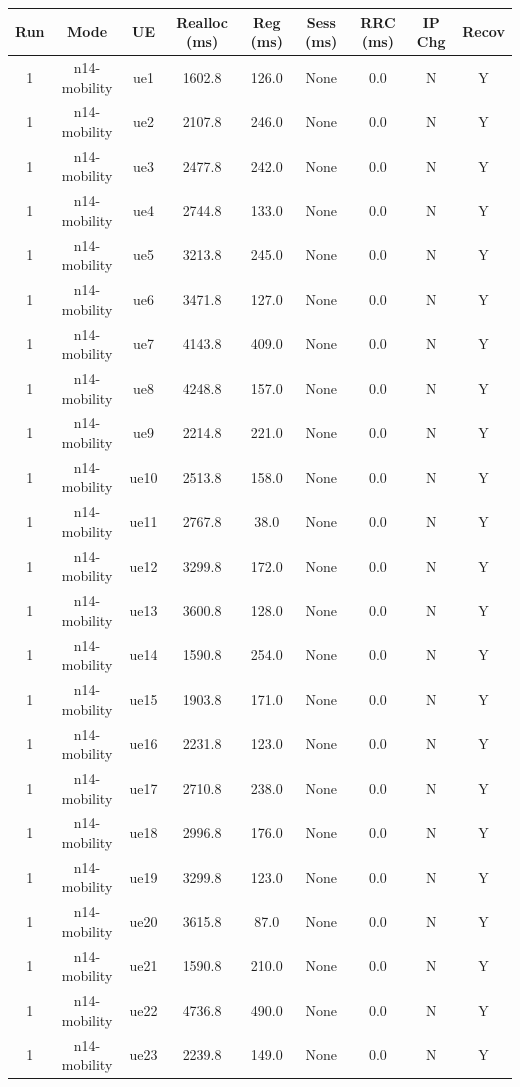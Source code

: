 \begin{table}[ht]
\centering
\begin{tabular}{|c|c|c|c|c|c|c|c|c|}
\hline
Run & Mode & UE & Realloc (ms) & Reg (ms) & Sess (ms) & RRC (ms) & IP Chg & Recov \\
\hline
1 & n14-mobility & ue1 & 1602.8 & 126.0 & None & 0.0 & N & Y \\
1 & n14-mobility & ue2 & 2107.8 & 246.0 & None & 0.0 & N & Y \\
1 & n14-mobility & ue3 & 2477.8 & 242.0 & None & 0.0 & N & Y \\
1 & n14-mobility & ue4 & 2744.8 & 133.0 & None & 0.0 & N & Y \\
1 & n14-mobility & ue5 & 3213.8 & 245.0 & None & 0.0 & N & Y \\
1 & n14-mobility & ue6 & 3471.8 & 127.0 & None & 0.0 & N & Y \\
1 & n14-mobility & ue7 & 4143.8 & 409.0 & None & 0.0 & N & Y \\
1 & n14-mobility & ue8 & 4248.8 & 157.0 & None & 0.0 & N & Y \\
1 & n14-mobility & ue9 & 2214.8 & 221.0 & None & 0.0 & N & Y \\
1 & n14-mobility & ue10 & 2513.8 & 158.0 & None & 0.0 & N & Y \\
1 & n14-mobility & ue11 & 2767.8 & 38.0 & None & 0.0 & N & Y \\
1 & n14-mobility & ue12 & 3299.8 & 172.0 & None & 0.0 & N & Y \\
1 & n14-mobility & ue13 & 3600.8 & 128.0 & None & 0.0 & N & Y \\
1 & n14-mobility & ue14 & 1590.8 & 254.0 & None & 0.0 & N & Y \\
1 & n14-mobility & ue15 & 1903.8 & 171.0 & None & 0.0 & N & Y \\
1 & n14-mobility & ue16 & 2231.8 & 123.0 & None & 0.0 & N & Y \\
1 & n14-mobility & ue17 & 2710.8 & 238.0 & None & 0.0 & N & Y \\
1 & n14-mobility & ue18 & 2996.8 & 176.0 & None & 0.0 & N & Y \\
1 & n14-mobility & ue19 & 3299.8 & 123.0 & None & 0.0 & N & Y \\
1 & n14-mobility & ue20 & 3615.8 & 87.0 & None & 0.0 & N & Y \\
1 & n14-mobility & ue21 & 1590.8 & 210.0 & None & 0.0 & N & Y \\
1 & n14-mobility & ue22 & 4736.8 & 490.0 & None & 0.0 & N & Y \\
1 & n14-mobility & ue23 & 2239.8 & 149.0 & None & 0.0 & N & Y \\

\end{tabular}
\end{table}
